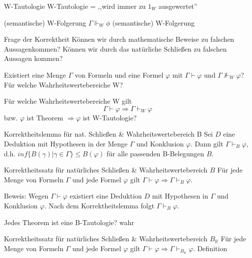 \documentclass[avery5371]{flashcards}
\begin{document}
\begin{flashcard}[ Wahrheitswertebereiche ]{ W-Tautologie }
    W-Tautologie = ,,wird immer zu $1_W$ ausgewertet''
\end{flashcard}

\begin{flashcard}[ Wahrheitswertebereiche ]{ (semantische) W-Folgerung }
    $\Gamma\Vdash_W \phi$ (semantische) W-Folgerung
\end{flashcard}

\begin{flashcard}[ Korrekheit ]{ Frage der Korrektheit }
    Können wir durch mathematische Beweise zu falschen Aussagenkommen?
    Können wir durch das natürliche Schließen zu falschen Aussagen kommen?

    Existiert eine Menge $\Gamma$ von Formeln und eine Formel $\varphi$ mit $\Gamma\vdash\varphi$ und $\Gamma\not\Vdash_W \varphi$? Für welche Wahrheitswertebereiche W?

    Für welche Wahrheitswertebereiche W gilt $$\Gamma\vdash\varphi\Rightarrow\Gamma\vdash_W \varphi$$ bzw. $\varphi$ ist Theorem $\Rightarrow\varphi$ ist W-Tautologie?
\end{flashcard}

\begin{flashcard}[ Korrekheit ]{ Korrektheitslemma für nat. Schließen \& Wahrheitswertebereich B }
    Sei $D$ eine Deduktion mit Hypothesen in der Menge $\Gamma$ und Konklusion $\varphi$. Dann gilt $\Gamma\vdash_B \varphi$, d.h. $inf\{B(\gamma)|\gamma\in\Gamma\}\leq B(\varphi)$ für alle passenden B-Belegungen $B$.
\end{flashcard}

\begin{flashcard}[ Korrekheit ]{ Korrektheitssatz für natürliches Schließen \& Wahrheitswertebereich $B$ }
    Für jede Menge von Formeln $\Gamma$ und jede Formel $\varphi$ gilt $\Gamma\vdash\varphi\Rightarrow\Gamma\vdash_B\varphi$.

    Beweis: Wegen $\Gamma\vdash\varphi$ existiert eine Deduktion $D$ mit Hypothesen in $\Gamma$ und Konklusion $\varphi$. Nach dem Korrektheitslemma folgt $\Gamma\vdash_B \varphi$.
\end{flashcard}

\begin{flashcard}[ Korrekheit ]{ Jedes Theorem ist eine B-Tautologie? }
    wahr
\end{flashcard}

\begin{flashcard}[ Korrekheit ]{ Korrektheitssatz für natürliches Schließen \& Wahrheitswertebereich $B_\mathbb{R}$}
    Für jede Menge von Formeln $\Gamma$ und jede Formel $\varphi$ gilt  $\Gamma\vdash\varphi\Rightarrow\Gamma\vdash_{B_\mathbb{R}}\varphi$.
    Definition
\end{flashcard}
\end{document}
